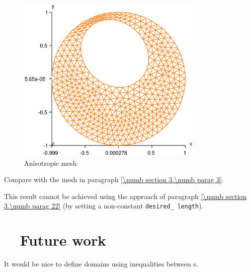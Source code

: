 \begin{figure} \centering
 \includegraphics[width=90mm]{disk-anisotrop}
  \caption{Anisotropic mesh}
  \label{\numb section 3.\numb fig 11}
\end{figure}

Compare with the mesh in paragraph \ref{\numb section 3.\numb parag 3}.

This result cannot be achieved using the approach of paragraph
\ref{\numb section 3.\numb parag 22} (by setting a non-constant {\small\tt desired\_\,length}).


\section{~~Future work}\label{\numb section 3.\numb parag 25}

It would be nice to define domains using inequalities between {\small\tt {}}s.

